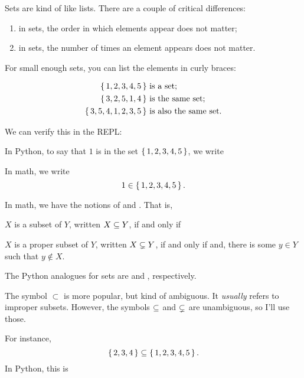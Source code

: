 Sets are kind of like lists. There are a couple of critical
differences:

\begin{enumerate}
\item in sets, the order in which elements appear does not matter;
\item in sets, the number of times an element appears does not matter.
\end{enumerate}

For small enough sets, you can list the elements in curly braces:

\begin{align*}
  \left\{\, 1,2,3,4,5 \,\right\} & \text{ is a set;} \\
  \left\{\, 3,2,5,1,4 \,\right\} & \text{ is the same set;} \\
  \left\{\, 3,5,4,1,2,3,5 \,\right\} & \text{ is also the same set.}
\end{align*}

We can verify this in the REPL:


In Python, to say that $1$ is in the set $\left\{\, 1,2,3,4,5 \,\right\}$, we write


In math, we write $$1 \in \left\{\, 1,2,3,4,5 \,\right\}.$$

In math, we have the notions of  and
. That is,

\begin{definition}
  $X$ is a subset of $Y$, written $X \subseteq Y$, if and only if
\end{definition}

\begin{definition}
  $X$ is a proper subset of $Y$, written $X \subsetneq Y$, if and only if
   and, there is some $y \in Y$
  such that $y \notin X$.
\end{definition}

The Python analogues for sets are \code{<=} and \code{<},
respectively.

\begin{remark}
  The symbol $\subset$ is more popular, but kind of ambiguous. It
  \emph{usually} refers to improper subsets. However, the symbols
  $\subseteq$ and $\subsetneq$ are unambiguous, so I'll use those.
\end{remark}

For instance, $$\left\{\, 2,3,4 \,\right\} \subseteq \left\{\, 1,2,3,4,5 \,\right\}.$$ In Python,
this is

